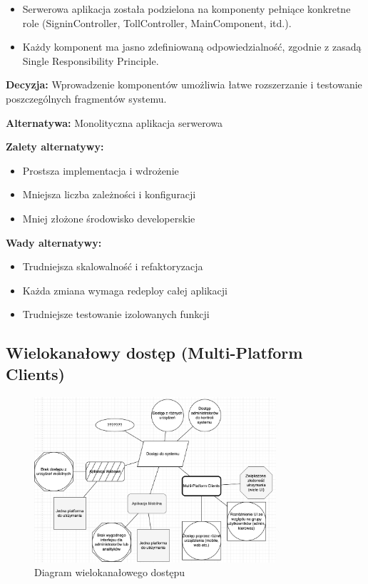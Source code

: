 \documentclass[12pt]{article}
\begin{document}
\begin{itemize}
\item Serwerowa aplikacja została podzielona na komponenty pełniące konkretne role (SigninController, TollController, MainComponent, itd.).
\item Każdy komponent ma jasno zdefiniowaną odpowiedzialność, zgodnie z zasadą Single Responsibility Principle.
\end{itemize}

\textbf{Decyzja:} Wprowadzenie komponentów umożliwia łatwe rozszerzanie i testowanie poszczególnych fragmentów systemu.

\textbf{Alternatywa:} Monolityczna aplikacja serwerowa

\textbf{Zalety alternatywy:}
\begin{itemize}
\item Prostsza implementacja i wdrożenie
\item Mniejsza liczba zależności i konfiguracji
\item Mniej złożone środowisko developerskie
\end{itemize}

\textbf{Wady alternatywy:}
\begin{itemize}
\item Trudniejsza skalowalność i refaktoryzacja
\item Każda zmiana wymaga redeploy całej aplikacji
\item Trudniejsze testowanie izolowanych funkcji
\end{itemize}

\subsection{Wielokanałowy dostęp (Multi-Platform Clients)}
\begin{figure}[h]
\centering
\includegraphics[width=0.8\textwidth]{dostep_do_systemu.png}
\caption{Diagram wielokanałowego dostępu}
\label{fig:multichannel}
\end{figure}
\end{document}
